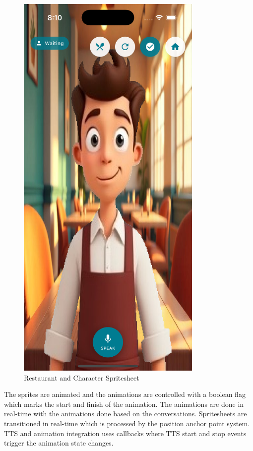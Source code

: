 \documentclass[MScCS]{uccthesis}
\begin{document}
\begin{figure}[htbp]
    \centering
    \includegraphics[width=0.8\textwidth,height=0.45\textheight,keepaspectratio]{Figures/restaurant_and_character_spritesheet.png}
    \caption{Restaurant and Character Spritesheet}
    \label{fig:restaurant_and_character_spritesheet}
\end{figure}

The sprites are animated and the animations are controlled with a boolean flag which marks the start and finish of the animation. The animations are done in real-time with the animations done based on the conversations. Spritesheets are transitioned in real-time which is processed by the position anchor point system. TTS and animation integration uses callbacks where TTS start and stop events trigger the animation state changes.
\end{document}
